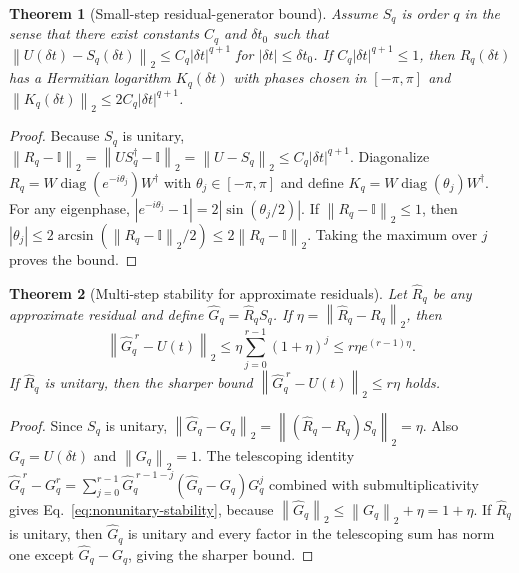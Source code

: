 \documentclass[aps,prxquantum,reprint,superscriptaddress,nofootinbib,amsmath,amssymb]{revtex4-2}
\newcommand{\norm}[1]{\left\lVert #1 \right\rVert}
\newcommand{\abs}[1]{\left\lvert #1 \right\rvert}
\newcommand{\id}{\mathbb{I}}
\newcommand{\dt}{\delta t}
\newtheorem{theorem}{Theorem}
\begin{document}
\begin{theorem}[Small-step residual-generator bound]
\label{thm:small-step}
Assume $S_q$ is order $q$ in the sense that there exist constants $C_q$ and $\dt_0$ such that $\norm{U(\dt)-S_q(\dt)}_2\leq C_q\abs{\dt}^{q+1}$ for $\abs{\dt}\leq\dt_0$. If $C_q\abs{\dt}^{q+1}\leq1$, then $R_q(\dt)$ has a Hermitian logarithm $K_q(\dt)$ with phases chosen in $[-\pi,\pi]$ and $\norm{K_q(\dt)}_2\leq 2C_q\abs{\dt}^{q+1}$.
\end{theorem}

\begin{proof}
Because $S_q$ is unitary, $\norm{R_q-\id}_2=\norm{US_q^\dagger-\id}_2=\norm{U-S_q}_2\leq C_q\abs{\dt}^{q+1}$. Diagonalize $R_q=W\operatorname{diag}(e^{-i\theta_j})W^\dagger$ with $\theta_j\in[-\pi,\pi]$ and define $K_q=W\operatorname{diag}(\theta_j)W^\dagger$. For any eigenphase, $\abs{e^{-i\theta_j}-1}=2\abs{\sin(\theta_j/2)}$. If $\norm{R_q-\id}_2\leq1$, then $\abs{\theta_j}\leq2\arcsin(\norm{R_q-\id}_2/2)\leq2\norm{R_q-\id}_2$. Taking the maximum over $j$ proves the bound.
\end{proof}

\begin{theorem}[Multi-step stability for approximate residuals]
\label{thm:residual-stability}
Let $\widehat R_q$ be any approximate residual and define $\widehat G_q=\widehat R_qS_q$. If $\eta=\norm{\widehat R_q-R_q}_2$, then
\begin{equation}
    \norm{\widehat G_q^{\;r}-U(t)}_2
    \leq \eta\sum_{j=0}^{r-1}(1+\eta)^j
    \leq r\eta e^{(r-1)\eta}.
    \label{eq:nonunitary-stability}
\end{equation}
If $\widehat R_q$ is unitary, then the sharper bound $\norm{\widehat G_q^{\;r}-U(t)}_2\leq r\eta$ holds.
\end{theorem}

\begin{proof}
Since $S_q$ is unitary, $\norm{\widehat G_q-G_q}_2=\norm{(\widehat R_q-R_q)S_q}_2=\eta$. Also $G_q=U(\dt)$ and $\norm{G_q}_2=1$. The telescoping identity $\widehat G_q^{\;r}-G_q^r=\sum_{j=0}^{r-1}\widehat G_q^{\;r-1-j}(\widehat G_q-G_q)G_q^j$ combined with submultiplicativity gives Eq.~\eqref{eq:nonunitary-stability}, because $\norm{\widehat G_q}_2\leq\norm{G_q}_2+\eta=1+\eta$. If $\widehat R_q$ is unitary, then $\widehat G_q$ is unitary and every factor in the telescoping sum has norm one except $\widehat G_q-G_q$, giving the sharper bound.
\end{proof}
\end{document}
